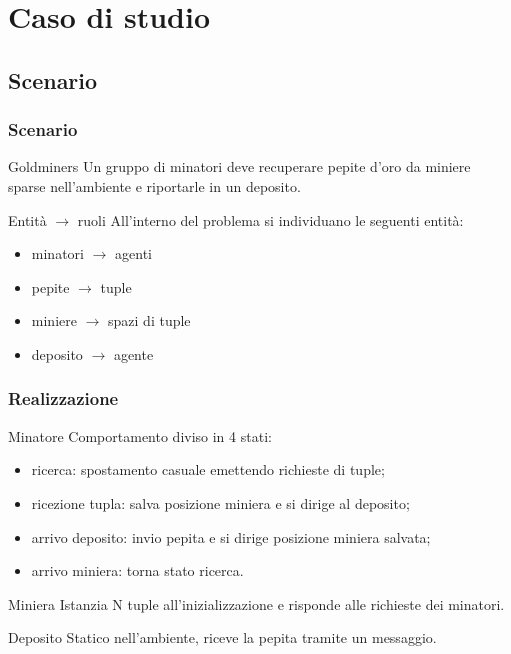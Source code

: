 \documentclass[handout]{beamer}\mode<presentation>{\usetheme{AMSCesenaBleu}}
\begin{document}
\section{Caso di studio}
\subsection{Scenario}
\begin{frame}
\frametitle{Scenario}
\begin{block}{Goldminers}
Un gruppo di minatori deve recuperare pepite d'oro da miniere sparse nell'ambiente e riportarle in un deposito.
\end{block}
\begin{block}{Entità $\rightarrow$ ruoli}
All'interno del problema si individuano le seguenti entità:
\begin{itemize}
\item \alert{minatori} $\rightarrow$ \alert{agenti}
\item pepite $\rightarrow$ tuple
\item \alert{miniere} $\rightarrow$ \alert{spazi di tuple}
\item deposito $\rightarrow$ agente
\end{itemize}
\end{block}
\end{frame}

\begin{frame}
\frametitle{Realizzazione}
\begin{block}{Minatore}
Comportamento diviso in 4 stati:
\begin{itemize}
\item \alert{ricerca}: spostamento casuale emettendo richieste di tuple;
\item \alert{ricezione tupla}: salva posizione miniera e si dirige al deposito;
\item \alert{arrivo deposito}: invio pepita e si dirige posizione miniera salvata;
\item \alert{arrivo miniera}: torna stato ricerca. 
\end{itemize}
\end{block}
\begin{block}{Miniera}
Istanzia N tuple all'inizializzazione e risponde alle richieste dei minatori.
\end{block}
\begin{block}{Deposito}
Statico nell'ambiente, riceve la pepita tramite un messaggio.
\end{block}
\end{frame}
\end{document}
